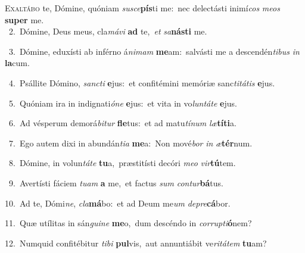 \lettrine{\initial\textcolor{\initialcolor}{E}}{xaltábo} te, Dómine, quóniam \textit{su}\-\textit{sce}\textbf{pís}ti me:~\star nec delectásti inimí\textit{cos} \textit{me}\-\textit{os} \textbf{su}\-\textbf{per} me.\\
{\numbfont\textcolor{\numbcolor}{~2.}}~Dómine, Deus meus, cla\-\textit{má}\-\textit{vi} \textbf{ad} te,~\star \textit{et} \textit{sa}\-\textbf{nás}\textbf{ti} me.\par
{\numbfont\textcolor{\numbcolor}{~3.}}~Dómine, eduxísti ab inférno á\-\textit{ni}\-\textit{mam} \textbf{me}\-am:~\star salvásti me a descendén\-\textit{ti}\-\textit{bus} \textit{in} \textbf{la}\-cum.\par
{\numbfont\textcolor{\numbcolor}{~4.}}~Psállite Dómino, \textit{sanc}\-\textit{ti} \textbf{e}\-jus:~\star et confitémini memóriæ sanc\-\textit{ti}\-\textit{tá}\textit{tis} \textbf{e}\-jus.\par
{\numbfont\textcolor{\numbcolor}{~5.}}~Quóniam ira in indignati\-\textit{ó}\-\textit{ne} \textbf{e}\-jus:~\star et vita in vo\-\textit{lun}\-\textit{tá}\textit{te} \textbf{e}\-jus.\par
{\numbfont\textcolor{\numbcolor}{~6.}}~Ad vésperum demorá\-\textit{bi}\-\textit{tur} \textbf{fle}\-tus:~\star et ad matu\-\textit{tí}\-\textit{num} \textit{læ}\-\textbf{tí}\textbf{ti}a.\par
{\numbfont\textcolor{\numbcolor}{~7.}}~Ego autem dixi in abundán\-\textit{ti}\-\textit{a} \textbf{me}\-a:~\star Non mové\textit{bor} \textit{in} \textit{æ}\-\textbf{tér}num.\par
{\numbfont\textcolor{\numbcolor}{~8.}}~Dómine, in volun\-\textit{tá}\-\textit{te} \textbf{tu}\-a,~\star præstitísti decóri \textit{me}\-\textit{o} \textit{vir}\-\textbf{tú}tem.\par
{\numbfont\textcolor{\numbcolor}{~9.}}~Avertísti fáciem \textit{tu}\-\textit{am} \textbf{a} me,~\star et factus \textit{sum} \textit{con}\-\textit{tur}\textbf{bá}tus.\par
{\numbfont\textcolor{\numbcolor}{10.}}~Ad te, Dómi\-\textit{ne}\-, \textit{cla}\-\textbf{má}bo:~\star et ad Deum me\textit{um} \textit{de}\-\textit{pre}\textbf{cá}bor.\par
{\numbfont\textcolor{\numbcolor}{11.}}~Quæ utílitas in sán\-\textit{gui}\-\textit{ne} \textbf{me}\-o,~\star dum descéndo in \textit{cor}\-\textit{rup}\textit{ti}\textbf{ó}nem?\par
{\numbfont\textcolor{\numbcolor}{12.}}~Numquid confitébitur \textit{ti}\-\textit{bi} \textbf{pul}\-vis,~\star aut annuntiábit ve\-\textit{ri}\-\textit{tá}\textit{tem} \textbf{tu}\-am?\par
